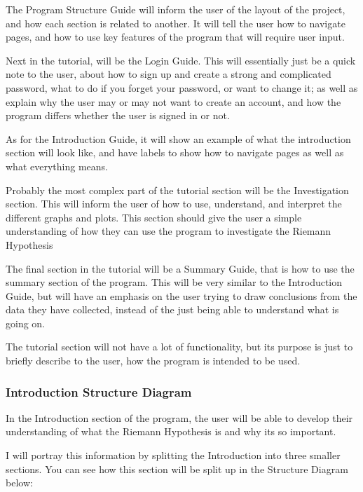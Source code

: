 \documentclass[12pt]{article}
\begin{document}
The Program Structure Guide will inform the user of the layout of the project, and how each section is related to another. It will tell the user how to navigate pages, and how to use key features of the program that will require user input.

Next in the tutorial, will be the Login Guide. This will essentially just be a quick note to the user, about how to sign up and create a strong and complicated password, what to do if you forget your password, or want to change it; as well as explain why the user may or may not want to create an account, and how the program differs whether the user is signed in or not.

As for the Introduction Guide, it will show an example of what the introduction section will look like, and have labels to show how to navigate pages as well as what everything means.

Probably the most complex part of the tutorial section will be the Investigation section. This will inform the user of how to use, understand, and interpret the different graphs and plots. This section should give the user a simple understanding of how they can use the program to investigate the Riemann Hypothesis

The final section in the tutorial will be a Summary Guide, that is how to use the summary section of the program. This will be very similar to the Introduction Guide, but will have an emphasis on the user trying to draw conclusions from the data they have collected, instead of the just being able to understand what is going on.

The tutorial section will not have a lot of functionality, but its purpose is just to briefly describe to the user, how the program is intended to be used.

\clearpage

\subsubsection{Introduction Structure Diagram}
In the Introduction section of the program, the user will be able to develop their understanding of what the Riemann Hypothesis is and why its so important.

I will portray this information by splitting the Introduction into three smaller sections. You can see how this section will be split up in the Structure Diagram below:
\end{document}
